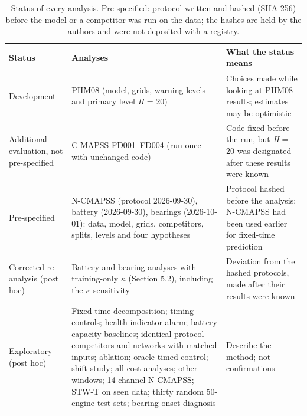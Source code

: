 \documentclass[a4paper,fleqn,doubleblind]{cas-dc}
\begin{document}
\begin{table}[!tbp]
\footnotesize\setlength{\tabcolsep}{4pt}
\caption{Status of every analysis. Pre-specified: protocol written and hashed (SHA-256) before the model or a competitor was run on the data; the hashes are held by the authors and were not deposited with a registry.}
\begin{tabular}{@{}>{\raggedright\arraybackslash}p{}>{\raggedright\arraybackslash}p{}>{\raggedright\arraybackslash}p{}@{}}
\toprule
Status & Analyses & What the status means \\
\midrule
Development & PHM08 (model, grids, warning levels and primary level \textit{H} = 20) & Choices made while looking at PHM08 results; estimates may be optimistic \\
Additional evaluation, not pre-specified & C-MAPSS FD001--FD004 (run once with unchanged code) & Code fixed before the run, but \textit{H} = 20 was designated after these results were known \\
Pre-specified & N-CMAPSS (protocol 2026-09-30), battery (2026-09-30), bearings (2026-10-01): data, model, grids, competitors, splits, levels and four hypotheses & Protocol hashed before the analysis; N-CMAPSS had been used earlier for fixed-time prediction \\
Corrected re-analysis (post hoc) & Battery and bearing analyses with training-only $\kappa$ (Section 5.2), including the $\kappa$ sensitivity & Deviation from the hashed protocols, made after their results were known \\
Exploratory (post hoc) & Fixed-time decomposition; timing controls; health-indicator alarm; battery capacity baselines; identical-protocol competitors and networks with matched inputs; ablation; oracle-timed control; shift study; all cost analyses; other windows; 14-channel N-CMAPSS; STW-T on seen data; thirty random 50-engine test sets; bearing onset diagnosis & Describe the method; not confirmations \\
\bottomrule
\end{tabular}
\end{table}
\end{document}
